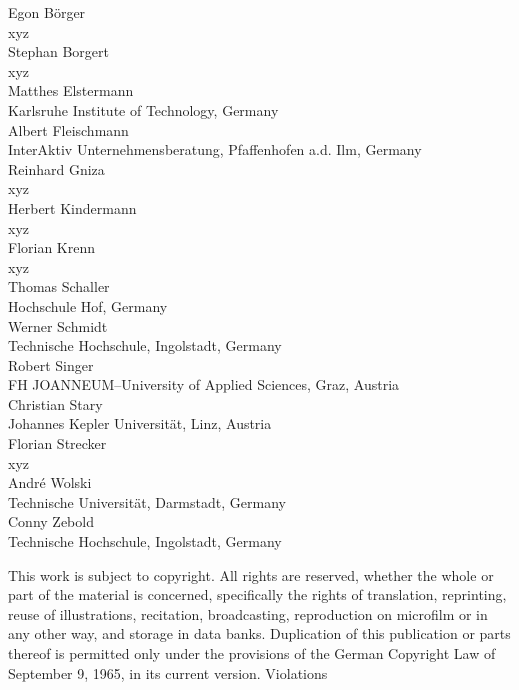 \documentclass[11pt, showtrims, final, oldfontcommands]{memoir}
\begin{document}
\begingroup
\footnotesize
\setlength{\parindent}{0pt}
\setlength{\parskip}{\baselineskip}
\vspace*{3cm}
\begin{flushleft}
	Egon B\"orger\\
	xyz\\
	\medskip
	Stephan Borgert\\
	xyz\\
	\medskip
	Matthes Elstermann\\
	Karlsruhe Institute of Technology, Germany\\
	\medskip
	Albert Fleischmann\\
	InterAktiv Unternehmensberatung, Pfaffenhofen a.d. Ilm, Germany\\
	\medskip
	Reinhard Gniza\\
	xyz\\
	\medskip
	Herbert Kindermann\\
	xyz\\
	\medskip
	Florian Krenn\\
	xyz\\
	\medskip
	Thomas Schaller\\
	Hochschule Hof, Germany\\
	\medskip
	Werner Schmidt\\
	Technische Hochschule, Ingolstadt, Germany\\
	\medskip
	Robert Singer\\
	FH JOANNEUM--University of Applied Sciences, Graz, Austria\\
	\medskip
	Christian Stary\\
	Johannes Kepler Universit\"at, Linz, Austria\\
	\medskip
	Florian Strecker\\
	xyz\\
	\medskip
	Andr\'e Wolski\\
	Technische Universit\"at, Darmstadt, Germany\\
	\medskip
	Conny Zebold\\
	Technische Hochschule, Ingolstadt, Germany\\
\end{flushleft}
\vspace*{\fill}
This work is subject to copyright. All rights are reserved, whether the whole or part of the material is concerned, specifically the rights of translation, reprinting, reuse of illustrations, recitation, broadcasting, reproduction on microfilm or in any other way, and storage in data banks. Duplication of this publication or parts thereof is permitted only under the provisions of the German Copyright Law of September 9, 1965, in its current version. Violations
\end{document}
